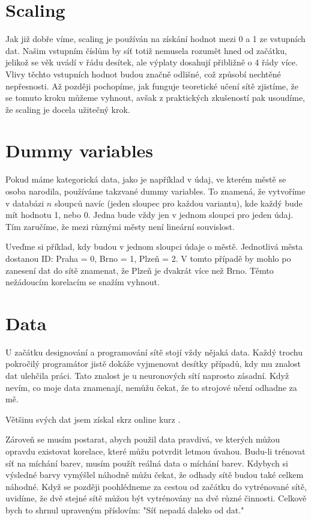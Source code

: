 \documentclass[12pt,a4paper]{report}
\begin{document}
	\section{Scaling}
	Jak již dobře víme, scaling je používán na získání hodnot mezi 0 a 1 ze vstupních dat. Našim vstupním číslům by síť totiž nemusela rozumět hned od začátku, jelikož se věk uvádí v řádu desítek, ale výplaty dosahují přibližně o 4 řády více. Vlivy těchto vstupních hodnot budou značně odlišné, což způsobí nechtěné nepřesnosti. Až později pochopíme, jak funguje teoretické učení sítě zjistíme, že se tomuto kroku můžeme vyhnout, avšak z praktických zkušeností pak usoudíme, že scaling je docela užitečný krok.
	\section{Dummy variables}
	Pokud máme kategorická data, jako je například v údaj, ve kterém městě se osoba narodila, používáme takzvané dummy variables. To znamená, že vytvoříme v databázi $n$ sloupců navíc (jeden sloupec pro každou variantu), kde každý bude mít hodnotu 1, nebo 0. Jedna bude vždy jen v jednom sloupci pro jeden údaj. Tím zaručíme, že mezi různými městy není lineární souvislost.
	
	Uveďme si příklad, kdy budou v jednom sloupci údaje o městě. Jednotlivá města dostanou ID: Praha = 0, Brno = 1, Plzeň = 2. V tomto případě by mohlo po zanesení dat do sítě znamenat, že Plzeň je dvakrát více než Brno. Těmto nežádoucím korelacím se snažím vyhnout.
	\section{Data}
	U začátku designování a programování sítě stojí vždy nějaká data. Každý trochu pokročilý programátor jistě dokáže vyjmenovat desítky případů, kdy mu znalost dat ulehčila práci. Tato znalost je u neuronových sítí naprosto zásadní. Když nevím, co moje data znamenají, nemůžu čekat, že to strojové učení odhadne za mě.
	
	Většinu svých dat jsem získal skrz online kurz \cite{eremenko}.
	
	Zároveň se musím postarat, abych použil data pravdivá, ve kterých můžou opravdu existovat korelace, které můžu potvrdit letmou úvahou. Budu-li trénovat síť na míchání barev, musím použít reálná data o míchání barev. Kdybych si výsledné barvy vymýšlel náhodně můžu čekat, že odhady sítě budou také celkem náhodné. Když se později poohlédneme za cestou od začátku do vytrénované sítě, uvidíme, že dvě stejné sítě můžou být vytrénovány na dvě různé činnosti. Celkově bych to shrnul upraveným příslovím: "Síť nepadá daleko od dat."
\end{document}
